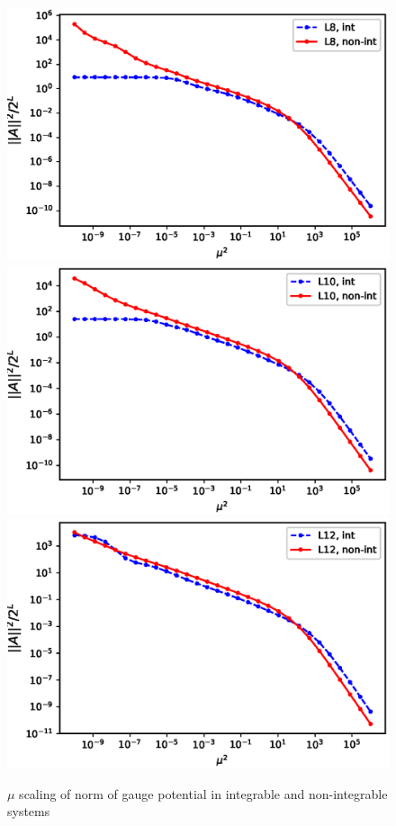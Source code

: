 \documentclass[11pt,a4paper]{article}
\begin{document}
\begin{figure}
\begin{center}
\includegraphics[scale=0.53]{norm_mu_scaling_L8.eps}
\includegraphics[scale=0.53]{norm_mu_scaling_L10.eps}\\
\includegraphics[scale=0.67]{norm_mu_scaling_L12.eps}
\caption{$\mu$ scaling of norm of gauge potential in integrable and non-integrable systems}
\end{center}
\end{figure}
\end{document}
